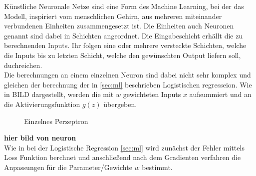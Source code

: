 Künstliche Neuronale Netze sind eine Form des Machine Learning, bei der das Modell, inspiriert vom menschlichen
Gehirn, aus mehreren miteinander verbundenen Einheiten zusammengesetzt ist. Die Einheiten auch Neuronen 
genannt sind dabei in Schichten angeordnet. Die Eingabeschicht erhällt die zu berechnenden Inputs. Ihr folgen
eine oder mehrere versteckte Schichten, welche die Inputs bis zu letzten Schicht, welche den gewünschten Output
liefern soll, duchreichen.
\\
Die berechnungen an einem einzelnen Neuron sind dabei nicht sehr komplex und gleichen der berechnung der 
in \ref{sec:ml} beschrieben Logistischen regresseion.
Wie in BILD dargestellt, werden die mit $w$ gewichteten Inputs $x$ aufsummiert und an die Aktivierungsfunktion
$g(z)$ übergeben.
\begin{figure}[htb]
    \centering
    
    \caption{Einzelnes Perzeptron}
    \label{fig:neuron}
\end{figure}

\textbf{hier bild von neuron}
\\
Wie in bei der Logistische Regression \ref{sec:ml} wird zunächst der Fehler mittels Loss Funktion berchnet und 
anschließend nach dem Gradienten verfahren die Anpassungen für die Parameter/Gewichte $w$ bestimmt.
\\







